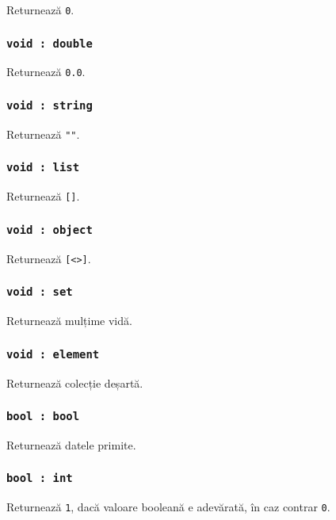 Returnează \lstinline|0|.

\subsubsection{\lstinline|void : double|}

Returnează \lstinline|0.0|.

\subsubsection{\lstinline|void : string|}

Returnează \lstinline|""|.

\subsubsection{\lstinline|void : list|}

Returnează \lstinline|[]|.

\subsubsection{\lstinline|void : object|}

Returnează \lstinline|[<>]|.

\subsubsection{\lstinline|void : set|}

Returnează mulțime vidă.

\subsubsection{\lstinline|void : element|}

Returnează colecție deșartă.

\subsubsection{\lstinline|bool : bool|}

Returnează datele primite.

\subsubsection{\lstinline|bool : int|}

Returnează \lstinline|1|, dacă valoare booleană e adevărată, în caz contrar \lstinline|0|.

